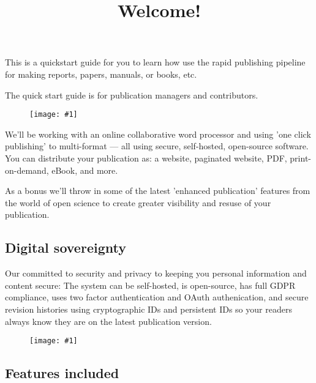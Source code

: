 \documentclass{article}
\newlength{\imgwidth}
\newcommand\scaledgraphics[2]{%
                
\settowidth{\imgwidth}{\texttt{[image: \#1]}}%
                
\setlength{\imgwidth}{\minof{\imgwidth}{#2\textwidth}}%
                
\texttt{[image: \#1]}%
                
}
\begin{document}
\title{Welcome!}

\maketitle


This is a quickstart guide for you to learn how use the rapid publishing pipeline for making reports, papers, manuals, or books, etc.


The quick start guide is for publication managers and contributors.

\begin{figure}
\scaledgraphics{b3bc6ba5-db38-4ec8-89db-45c029fdb485.png}{1}
\label{F98934631}
\end{figure}


We'll be working with an online collaborative word processor and using 'one click publishing' to multi-format — all using secure, self-hosted, open-source software. You can distribute your publication as: a website, paginated website, PDF, print-on-demand, eBook, and more.


As a bonus we'll throw in some of the latest 'enhanced publication' features from the world of open science to create greater visibility and resuse of your publication.


\subsection{Digital sovereignty}\label{H584803}



Our committed to security and privacy to keeping you personal information and content secure: The system can be self-hosted, is open-source, has full GDPR compliance, uses two factor authentication and OAuth authenication, and secure revision histories using cryptographic IDs and persistent IDs so your readers always know they are on the latest publication version. 

\begin{figure}
\scaledgraphics{60a0cd01-c4e1-467e-a517-a5ae77dbbbaf.png}{0.75}
\label{F45597451}
\end{figure}


\subsection{Features included}\label{H2087393}
\end{document}

